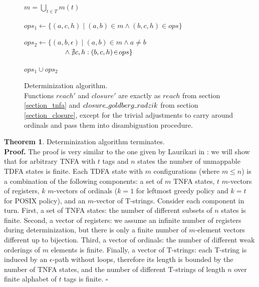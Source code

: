 \documentclass{article}
\newcommand{\Xset}{\!\leftarrow\!}
\newcommand{\Xund}{\rule{.4em}{.4pt}} %
\newcommand{\Xin}{\!\in\!}
\newcommand{\Xeq}{\!=\!}
\theoremstyle{definition}
\newtheorem{XThe}{Theorem}
\begin{document}
\begin{multicols}{2}
\begin{figure}
\begin{algorithm}[H]
\begin{multicols}{2}
{{            \Let $m \Xeq \bigcup_{t \in T} m(t)$ \;

            $ops_1 \Xset \{ (a, c, h) \mid (a, b) \Xin m \wedge (b, c, h) \Xin ops \}$ \;

            $ops_2 \Xset \{ (a, b, \epsilon) \mid (a, b) \Xin m \wedge a \!\neq\! b$
                $\hphantom{hspace{1.5em}} \wedge \nexists c, h: (b, c, h) \Xin ops \}$ \;

            \Return $ops_1 \cup ops_2$ \;
        } \lElse {
            \Return \Und
        }
    }

\end{multicols}
\end{algorithm}
\begin{center}
\caption{Determinization algorithm.\\
Functions $reach'$ and $closure'$ are exactly as
$reach$ from section \ref{section_tnfa} and $closure \Xund goldberg \Xund radzik$ from section \ref{section_closure},
except for the trivial adjustments to carry around ordinals and pass them into disambiguation procedure.
}
\end{center}
\end{figure}

\begin{XThe}
Determinization algorithm terminates.
\\[0.5em]
\textbf{Proof.}
The proof is very similar to the one given by Laurikari in \cite{Lau00}:
we will show that for arbitrary TNFA with $t$ tags and $n$ states the number of unmappable TDFA states is finite.
Each TDFA state with $m$ configurations (where $m \!\leq\! n$) is a combination of the following components:
a set of $m$ TNFA states,
$t$ $m$-vectors of registers,
$k$ $m$-vectors of ordinals ($k \Xeq 1$ for leftmost greedy policy and $k \Xeq t$ for POSIX policy),
and an $m$-vector of T-strings.
Consider each component in turn.
First, a set of TNFA states: the number of different subsets of $n$ states is finite.
Second, a vector of registers: we assume an infinite number of registers during determinization,
but there is only a finite number of $m$-element vectors different up to bijection.
Third, a vector of ordinals: the number of different weak orderings of $m$ elements is finite.
Finally, a vector of T-strings: each T-string is induced by an $\epsilon$-path without loops,
therefore its length is bounded by the number of TNFA states,
and the number of different T-strings of length $n$ over finite alphabet of $t$ tags is finite.
$\square$
\end{XThe}


\end{multicols}
\end{document}
